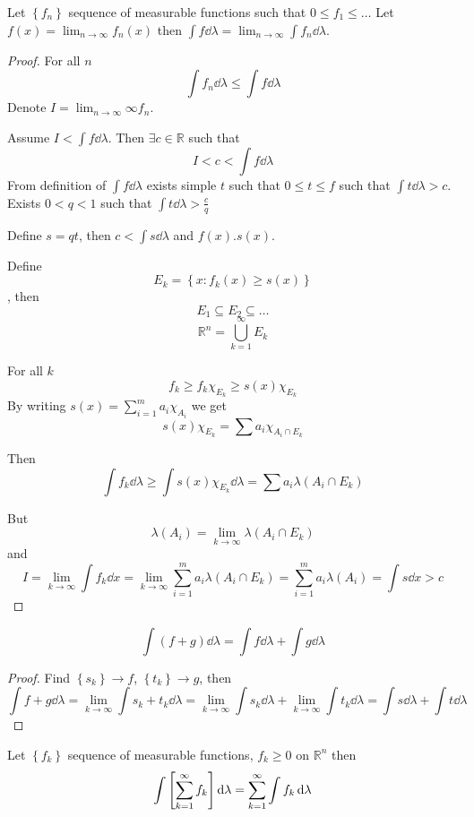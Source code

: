 \begin{theorem}
Let $\left\{ f_n\right\}$ sequence of measurable functions such that $0\leq f_1\leq \dots $
Let $f(x) = \lim_{n\to\infty} f_n(x)$ then $\int f\dd{\lambda} = \lim_{n\to\infty} \int f_n \dd{\lambda}$.
\begin{proof}
	For all $n$
	$$\int f_n \dd{\lambda} \leq \int f\dd{\lambda}$$
	Denote $I = \lim_{n\to\infty} \infty f_n$.
	
	Assume $I<\int f\dd{\lambda}$. Then $\exists c\in \mathbb{R}$ such that
	$$I<c<\int f\dd{\lambda}$$
	From definition of $\int f\dd{\lambda}$ exists simple $t$ such that $0\leq t\leq f$ such that $\int t \dd{\lambda} > c$. Exists $0<q<1$ such that $\int t \dd{\lambda} > \frac{c}{q}$
	
	Define $s=qt$, then $c<\int s \dd{\lambda}$ and $f(x).s(x)$.
	
	Define $$E_k = \left\{ x: f_k(x) \geq s(x) \right\}$$, then
	$$E_1 \subseteq E_2 \subseteq \dots$$
	$$\mathbb{R}^n = \bigcup_{k=1}^\infty E_k$$
	
	For all $k$
	$$f_k \geq f_k \chi_{E_k} \geq s(x) \chi_{E_k}$$
	By writing $s(x) = \sum_{i=1}^m a_i \chi_{A_i}$ we get
	$$ s(x) \chi_{E_k} = \sum a_i \chi_{A_i \cap E_k}$$
	
	Then
	$$\int f_k \dd{\lambda} \geq \int s(x) \chi_{E_k} \dd{\lambda} = \sum a_i \lambda(A_i \cap E_k)$$
	
	But
	$$\lambda(A_i)  = \lim_{k\to \infty} \lambda(A_i\cap E_k)$$
	and
	$$I = \lim_{k\to \infty} \int f_k \dd{x} = \lim_{k\to \infty} \sum_{i=1}^m a_i \lambda(A_i \cap E_k) = \sum_{i=1}^m a_i \lambda(A_i) =\int s \dd{x} > c$$
	
\end{proof}
\begin{coll}
	$$\int (f+g) \dd{\lambda} = \int f\dd{\lambda} + \int g \dd{\lambda}$$
	\begin{proof}
		Find $\left\{s_k\right\} \to f$, $\left\{t_k\right\} \to g$, then
		$$\int f+g \dd{\lambda} = \lim_{k\to \infty} \int s_k+t_k \dd{\lambda}= \lim_{k\to \infty} \int s_k\dd{\lambda}+\lim_{k\to \infty} \int  t_k \dd{\lambda} = \int s\dd{\lambda} + \int t \dd{\lambda}$$
	\end{proof}
\end{coll}

\begin{coll}
	Let $\left\{ f_k \right\}$ sequence of measurable functions, $f_k\geq 0$ on $\mathbb{R}^n$ then
	$$\int \qty[\sum_{k=1}^\infty f_k ] \dd{\lambda} = \sum_{k=1}^\infty \int f_k \dd{\lambda}$$
\end{coll}
\end{theorem}
